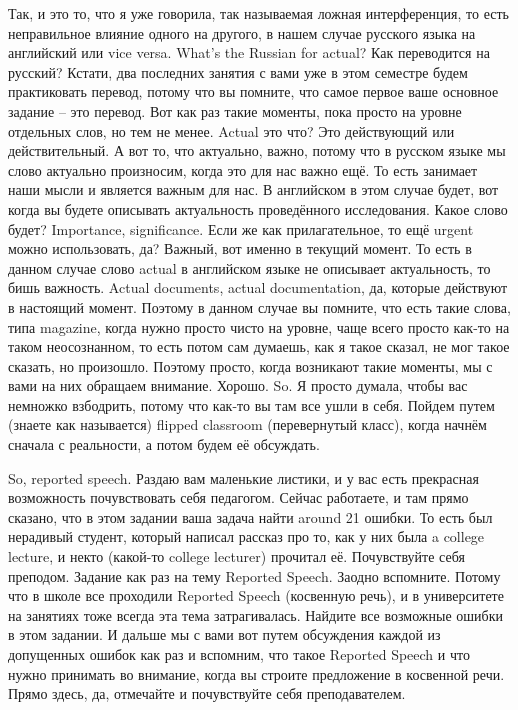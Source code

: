 \documentclass[main.tex]{subfiles}
\begin{document}
Так, и это то, что я уже говорила, так называемая ложная интерференция, то есть неправильное влияние одного на другого, в нашем случае русского языка на английский или vice versa.
What's the Russian for actual?
Как переводится на русский?
Кстати, два последних занятия с вами уже в этом семестре будем практиковать перевод, потому что вы помните, что самое первое ваше основное задание -- это перевод.
Вот как раз такие моменты, пока просто на уровне отдельных слов, но тем не менее.
Actual это что?
Это действующий или действительный.
А вот то, что актуально, важно, потому что в русском языке мы слово актуально произносим, когда это для нас важно ещё.
То есть занимает наши мысли и является важным для нас.
В английском в этом случае будет, вот когда вы будете описывать актуальность проведённого исследования.
Какое слово будет?
Importance, significance.
Если же как прилагательное, то ещё urgent можно использовать, да?
Важный, вот именно в текущий момент.
То есть в данном случае слово actual в английском языке не описывает актуальность, то бишь важность.
Actual documents, actual documentation, да, которые действуют в настоящий момент.
Поэтому в данном случае вы помните, что есть такие слова, типа magazine, когда нужно просто чисто на уровне, чаще всего просто как-то на таком неосознанном, то есть потом сам думаешь, как я такое сказал, не мог такое сказать, но произошло.
Поэтому просто, когда возникают такие моменты, мы с вами на них обращаем внимание.
Хорошо.
So.
Я просто думала, чтобы вас немножко взбодрить, потому что как-то вы там все ушли в себя.
Пойдем путем (знаете как называется) flipped classroom (перевернутый класс), когда начнём сначала с реальности, а потом будем её обсуждать.

\newpage
{}

So, reported speech.
Раздаю вам маленькие листики, и у вас есть прекрасная возможность почувствовать себя педагогом.
Сейчас работаете, и там прямо сказано, что в этом задании ваша задача найти around 21 ошибки.
То есть был нерадивый студент, который написал рассказ про то, как у них была a college lecture, и некто (какой-то college lecturer) прочитал её.
Почувствуйте себя преподом.
Задание как раз на тему Reported Speech.
Заодно вспомните.
Потому что в школе все проходили Reported Speech (косвенную речь), и в университете на занятиях тоже всегда эта тема затрагивалась.
Найдите все возможные ошибки в этом задании.
И дальше мы с вами вот путем обсуждения каждой из допущенных ошибок как раз и вспомним, что такое Reported Speech и что нужно принимать во внимание, когда вы строите предложение в косвенной речи.
Прямо здесь, да, отмечайте и почувствуйте себя преподавателем.
\\
\end{document}

